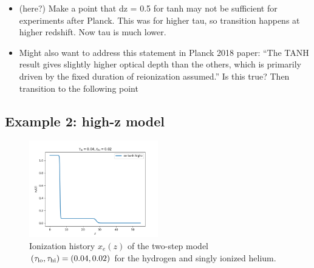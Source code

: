 \documentclass[prd,twocolumn,amsmath,amssymb,floatfix,superscriptaddress,nofootinbib]{revtex4-1}
\newcommand{\tauhi}{\tau_{\rm hi}}
\newcommand{\taulo}{\tau_{\rm lo}}
\begin{document}
\begin{itemize}
    \item (here?) Make a point that dz = 0.5 for tanh may not be sufficient for experiments after Planck. This was for higher tau, so transition happens at higher redshift. Now tau is much lower.
    \item{Might also want to address this statement in Planck 2018 paper: ``The TANH result gives slightly higher optical  depth  than  the  others,  which  is  primarily driven  by  the  fixed  duration  of  reionization assumed.” Is this true? Then transition to the following point}
\end{itemize}


 

\subsection{Example 2: high-z model}
\label{sec:example2}


\begin{figure}
\includegraphics[width=0.5\textwidth]{results/cosmomc_kde/taulo_prior_test/plot_xez_taulo_0p04_tauhi_0p02.png}
\caption{Ionization history $x_e(z)$ of the two-step model $(\taulo, \tauhi) = (0.04, 0.02)$ for the hydrogen and singly ionized helium.
}
\label{fig:two_step_model}
\end{figure}
 
\end{document}

